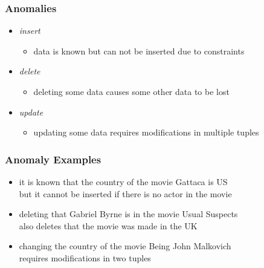 \documentclass[dvipsnames]{beamer}
\begin{document}
\begin{frame}
  \frametitle{Anomalies}

  \begin{itemize}
    \item \emph{insert}
    \begin{itemize}
      \item data is known but can not be inserted due to constraints
    \end{itemize}

    \pause
    \item \emph{delete}
    \begin{itemize}
        \item deleting some data causes some other data to be lost
    \end{itemize}

    \pause
    \item \emph{update}
    \begin{itemize}
      \item updating some data requires modifications in multiple tuples
    \end{itemize}
  \end{itemize}
\end{frame}

\begin{frame}
  \frametitle{Anomaly Examples}

  \begin{example}
    \begin{itemize}
      \item it is known that the country of the movie Gattaca is US\\
	but it cannot be inserted if there is no actor in the movie

      \pause
      \item deleting that Gabriel Byrne is in the movie Usual Suspects\\
        also deletes that the movie was made in the UK

      \pause
      \item changing the country of the movie Being John Malkovich\\
        requires modifications in two tuples
    \end{itemize}
  \end{example}
\end{frame}
\end{document}
